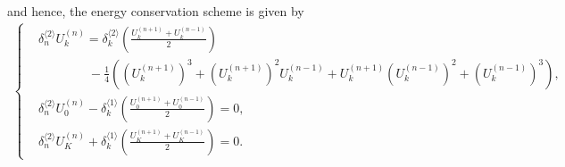\documentclass[dvipdfmx-if-dvi,autodetect-engine,ja=standard]{amsart}
\numberwithin{equation}{section} %
\begin{document}
and hence, the energy conservation scheme is given by
\begin{align}\label{eq:scheme:-u^3:sec3}
    \left\{
    \begin{alignedat}{1}
    &\delta_n^{\langle 2\rangle} U_k^{(n)}
    = \delta_k^{\langle 2 \rangle}
    \left(
        \frac{U_k^{(n+1)}+U_k^{(n-1)}}{2}
    \right) \\
    &\qquad \qquad - \frac{1}{4} \left(
    (U_k^{(n+1)})^3 + (U_k^{(n+1)})^2 U_k^{(n-1)}
    + U_k^{(n+1)} (U_k^{(n-1)})^2 + (U_k^{(n-1)})^3
    \right),\\
    &\delta_n^{\langle 2\rangle} U_0^{(n)}
        - \delta_k^{\langle 1 \rangle}
        \left(
            \frac{U_0^{(n+1)}+U_0^{(n-1)}}{2}
        \right)
        = 0,\\
    &\delta_n^{\langle 2\rangle} U_K^{(n)}
       + \delta_k^{\langle 1 \rangle}
        \left(
            \frac{U_K^{(n+1)}+U_K^{(n-1)}}{2}
        \right)
        = 0.
    \end{alignedat}
    \right.
\end{align}



\end{document}
